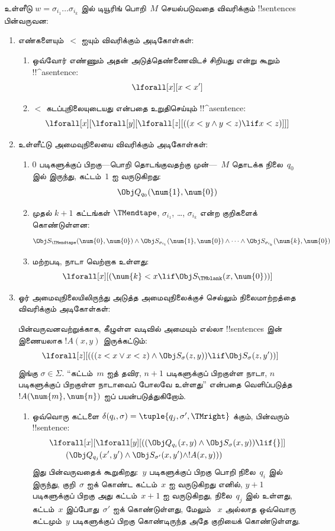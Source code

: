\documentclass[../../../include/open-logic-section]{subfiles}
\begin{document}
உள்ளீடு $w = \sigma_{i_1}\dots\sigma_{i_k}$ இல் டியூரிங் பொறி~$M$
செயல்படுவதை விவரிக்கும் !!{sentence}s பின்வருவன:
\begin{enumerate}
\item எண்களையும்~$<$ ஐயும் விவரிக்கும் அடிகோள்கள்:
\begin{enumerate}
\item ஒவ்வோர் எண்ணும் அதன் அடுத்தெண்ணைவிடச் சிறியது என்று கூறும்
!!^a{sentence}:
\[
\lforall[x][x < x']
\]
\item $<$ கடப்புநிலையுடையது என்பதை உறுதிசெய்யும் !!^a{sentence}:
\[
\lforall[x][\lforall[y][\lforall[z][
      ((x < y \land y < z) \lif x < z)]]]
\]
\end{enumerate}
\item உள்ளீட்டு அமைவுநிலையை விவரிக்கும் அடிகோள்கள்:
\begin{enumerate}
\item $0$ படிகளுக்குப் பிறகு---பொறி தொடங்குவதற்கு முன்---~$M$
  தொடக்க நிலை~$q_0$ இல் இருந்து, கட்டம்~$1$ ஐ வருடுகிறது:
\[
\Obj Q_{q_0}(\num{1}, \num{0})
\]
\item முதல் $k+1$ கட்டங்கள் $\TMendtape$,
  $\sigma_{i_1}$, \dots, $\sigma_{i_k}$ என்ற குறிகளைக் கொண்டுள்ளன:
\[
\Obj S_\TMendtape(\num{0}, \num{0}) \land
\Obj S_{\sigma_{i_1}}(\num{1}, \num{0}) \land
\dots \land
\Obj S_{\sigma_{i_k}}(\num{k}, \num{0})
\]
\item மற்றபடி, நாடா வெற்றாக உள்ளது:
\[
\lforall[x][(\num{k} < x \lif \Obj S_\TMblank(x, \num{0}))]
\]
\end{enumerate}
\item ஓர் அமைவுநிலையிலிருந்து அடுத்த அமைவுநிலைக்குச் செல்லும்
  நிலைமாற்றத்தை விவரிக்கும் அடிகோள்கள்:

பின்வருவனவற்றுக்காக, கீழுள்ள வடிவில் அமையும் எல்லா !!{sentence}s
இன் இணையலாக $!A(x, y)$ இருக்கட்டும்:
\[
\lforall[z][
  (((z < x \lor x < z) \land \Obj S_\sigma(z, y))
  \lif \Obj S_\sigma(z, y'))]
\]
இங்கு $\sigma \in \Sigma$. ``கட்டம்~$m$ ஐத் தவிர, $n+1$
படிகளுக்குப் பிறகுள்ள நாடா, $n$ படிகளுக்குப் பிறகுள்ள நாடாவைப்
போலவே உள்ளது'' என்பதை வெளிப்படுத்த $!A(\num{m},\num{n})$ ஐப்
பயன்படுத்துகிறோம்.
\begin{enumerate}
\item {} ஒவ்வொரு கட்டளை $\delta(q_i, \sigma) =
  \tuple{q_j, \sigma', \TMright}$ க்கும், பின்வரும் !!{sentence}:
\begin{align*}
& \lforall[x][\lforall[y][(
   (\Obj Q_{q_i}(x, y) \land \Obj S_{\sigma}(x, y)) \lif {}]] \\
&\qquad   (\Obj Q_{q_j}(x', y') \land \Obj S_{\sigma'}(x, y') \land
!A(x, y)))
\end{align*}
இது பின்வருவதைக் கூறுகிறது:~$y$ படிகளுக்குப் பிறகு பொறி நிலை~$q_i$
இல் இருந்து, குறி~$\sigma$ ஐக் கொண்ட கட்டம்~$x$ ஐ வருடுகிறது எனில்,
$y+1$ படிகளுக்குப் பிறகு அது கட்டம்~$x+1$ ஐ வருடுகிறது, நிலை~$q_j$
இல் உள்ளது, கட்டம்~$x$ இப்போது~$\sigma'$ ஐக் கொண்டுள்ளது, மேலும்
~$x$ அல்லாத ஒவ்வொரு கட்டமும்~$y$ படிகளுக்குப் பிறகு கொண்டிருந்த அதே
குறியைக் கொண்டுள்ளது.


\end{enumerate}
\end{enumerate}
\end{document}
